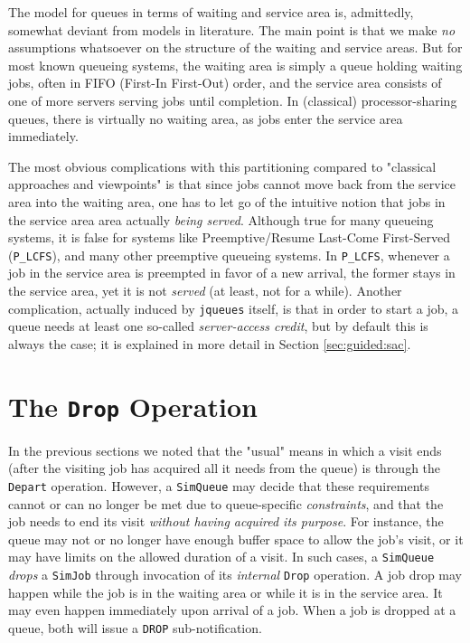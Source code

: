 The model for queues in terms of waiting and service area is,
  admittedly, somewhat deviant from models in literature.
The main point is that we make {\em no\/} assumptions
  whatsoever on the structure of the waiting and service areas.
But for most known queueing systems,
  the waiting area is simply a queue holding waiting jobs,
  often in FIFO (First-In First-Out) order,
  and the service area consists of one of more servers
  serving jobs until completion.
In (classical) processor-sharing queues,
  there is virtually no waiting area,
  as jobs enter the service area immediately.

The most obvious complications with this partitioning
  compared to "classical approaches and viewpoints"
  is that since jobs cannot move back from the service area
  into the waiting area,
  one has to let go of the intuitive notion that
  jobs in the service area area actually {\em being served}.
Although true for many queueing systems,
  it is false for systems
  like Preemptive/Resume Last-Come First-Served
  (\lstinline|P_LCFS|),
  and many other preemptive queueing systems.
In \lstinline|P_LCFS|,
  whenever a job in the service area is preempted
  in favor of a new arrival,
  the former stays in the service area,
  yet it is not {\em served\/}
  (at least, not for a while).
Another complication,
  actually induced by \lstinline|jqueues| itself,
  is that in order to start a job,
  a queue needs at least one so-called
  {\em server-access credit},
  but by default this is always the case;
  it is explained in more detail
  in Section \ref{sec:guided:sac}.

\section{The \texttt{\bf Drop} Operation}
\label{sec:drop}
            
In the previous sections
  we noted that the "usual" means in
  which a visit ends
  (after the visiting job has acquired all it needs from the queue)
  is through the \lstinline|Depart| operation.
However, a \lstinline|SimQueue| may decide
  that these requirements cannot or can no longer be met
  due to queue-specific {\em constraints},
  and that the job needs to end its visit
  {\em without having acquired its purpose}.
For instance,
  the queue may not or no longer have enough buffer space
  to allow the job's visit,
  or it may have limits on the
  allowed duration of a visit.
In such cases,
  a \lstinline|SimQueue| {\em drops\/}
  a \lstinline|SimJob|
  through invocation of its {\em internal\/}
  \lstinline|Drop| operation.
A job drop may happen while the job is in the waiting
  area or while it is in the service area.
It may even happen immediately upon arrival of a job.
When a job is dropped at a queue,
  both will issue a \lstinline|DROP|
  sub-notification.
  
